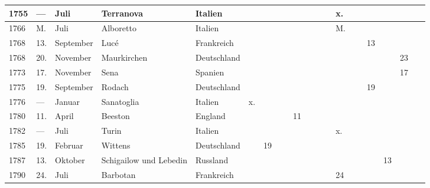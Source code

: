 \documentclass[a4paper, 8pt, oneside, polutonikogreek, german]{article}
\begin{document}
\begin{landscape}
\begin{table}[H]
\begin{longtable}{|p{5mm}|p{4mm}|p{13mm}|p{17mm}|p{17mm}|p{4mm}|p{6mm}|p{6mm}|p{6mm}|p{4mm}|p{5mm}|p{4mm}|p{5mm}|p{6mm}|p{5mm}|p{5mm}|p{5mm}|}
        1755 & --- & Juli & Terranova & Italien & ~ & ~ & ~ & ~ & ~ & ~ & x. & ~ & ~ & ~ & ~ & ~ \\ \hline
        1766 & M. & Juli & Alboretto & Italien & ~ & ~ & ~ & ~ & ~ & ~ & M. & ~ & ~ & ~ & ~ & ~ \\ \hline
        1768 & 13. & September & Lucé & Frankreich & ~ & ~ & ~ & ~ & ~ & ~ & ~ & ~ & 13 & ~ & ~ & ~ \\ \hline
        1768 & 20. & November & Maurkirchen & Deutschland & ~ & ~ & ~ & ~ & ~ & ~ & ~ & ~ & ~ & ~ & 23 & ~ \\ \hline
        1773 & 17. & November & Sena & Spanien & ~ & ~ & ~ & ~ & ~ & ~ & ~ & ~ & ~ & ~ & 17 & ~ \\ \hline
        1775 & 19. & September & Rodach & Deutschland & ~ & ~ & ~ & ~ & ~ & ~ & ~ & ~ & 19 & ~ & ~ & ~ \\ \hline
        1776 & --- & Januar & Sanatoglia & Italien & x. & ~ & ~ & ~ & ~ & ~ & ~ & ~ & ~ & ~ & ~ & ~ \\ \hline
        1780 & 11. & April & Beeston & England & ~ & ~ & ~ & 11 & ~ & ~ & ~ & ~ & ~ & ~ & ~ & ~ \\ \hline
        1782 & --- & Juli & Turin & Italien & ~ & ~ & ~ & ~ & ~ & ~ & x. & ~ & ~ & ~ & ~ & ~ \\ \hline
        1785 & 19. & Februar & Wittens & Deutschland & ~ & 19 & ~ & ~ & ~ & ~ & ~ & ~ & ~ & ~ & ~ & ~ \\ \hline
        1787 & 13. & Oktober & Schigailow und Lebedin & Russland & ~ & ~ & ~ & ~ & ~ & ~ & ~ & ~ & ~ & 13 & ~ & ~ \\ \hline
        1790 & 24. & Juli & Barbotan & Frankreich & ~ & ~ & ~ & ~ & ~ & ~ & 24 & ~ & ~ & ~ & ~ & ~ \\ \hline
    \end{longtable}
\end{table}
\vspace*{\fill}
\end{landscape}
\clearpage
\end{document}
